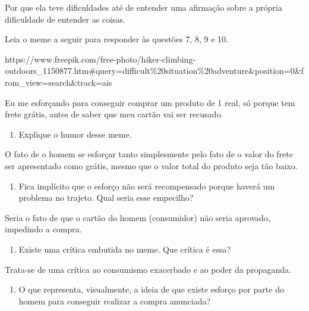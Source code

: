 \begin{itemize}
\begin{itemize}

Por que ela teve dificuldades até de entender uma afirmação sobre a
própria dificuldade de entender as coisas.

Leia o meme a seguir para responder às questões 7, 8, 9 e 10.

https://www.freepik.com/free-photo/hiker-climbing-outdoors\_1150877.htm\#query=difficult\%20situation\%20adventure\&position=0\&from\_view=search\&track=ais

Eu me esforçando para conseguir comprar um produto de 1 real, só porque
tem frete grátis, antes de saber que meu cartão vai ser recusado.

\begin{enumerate}
\def\labelenumi{\arabic{enumi}.}
\setcounter{enumi}{6}
\tightlist
\item
  Explique o humor desse meme.
\end{enumerate}


O fato de o homem se esforçar tanto simplesmente pelo fato de o valor do
frete ser apresentado como grátis, mesmo que o valor total do produto
seja tão baixo.

\begin{enumerate}
\def\labelenumi{\arabic{enumi}.}
\setcounter{enumi}{7}
\tightlist
\item
  Fica implícito que o esforço não será recompensado porque haverá um
  problema no trajeto. Qual seria esse empecilho?
\end{enumerate}


Seria o fato de que o cartão do homem (consumidor) não seria aprovado,
impedindo a compra.

\begin{enumerate}
\def\labelenumi{\arabic{enumi}.}
\setcounter{enumi}{8}
\tightlist
\item
  Existe uma crítica embutida no meme. Que crítica é essa?
\end{enumerate}


Trata-se de uma crítica ao consumismo exacerbado e ao poder da
propaganda.

\begin{enumerate}
\def\labelenumi{\arabic{enumi}.}
\setcounter{enumi}{9}
\tightlist
\item
  O que representa, visualmente, a ideia de que existe esforço por parte
  do homem para conseguir realizar a compra anunciada?
\end{enumerate}


\end{itemize}
\end{itemize}
